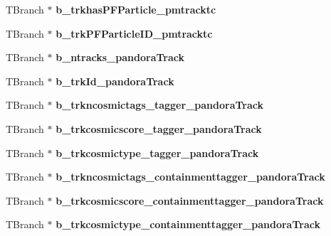 \begin{DoxyCompactItemize}
\item 
\hypertarget{classanatree_a45ab227987467c729806898d0ed23a5f}{T\-Branch $\ast$ {\bfseries b\-\_\-trkhas\-P\-F\-Particle\-\_\-pmtracktc}}\label{classanatree_a45ab227987467c729806898d0ed23a5f}

\item 
\hypertarget{classanatree_aa2272aed6f8daf4970c8b10839373021}{T\-Branch $\ast$ {\bfseries b\-\_\-trk\-P\-F\-Particle\-I\-D\-\_\-pmtracktc}}\label{classanatree_aa2272aed6f8daf4970c8b10839373021}

\item 
\hypertarget{classanatree_a3fe1408a4b38ef9ccce5cb055e4ef1a6}{T\-Branch $\ast$ {\bfseries b\-\_\-ntracks\-\_\-pandora\-Track}}\label{classanatree_a3fe1408a4b38ef9ccce5cb055e4ef1a6}

\item 
\hypertarget{classanatree_a032199668b40171279c6d42655ae8692}{T\-Branch $\ast$ {\bfseries b\-\_\-trk\-Id\-\_\-pandora\-Track}}\label{classanatree_a032199668b40171279c6d42655ae8692}

\item 
\hypertarget{classanatree_a49f812bf3a93903d7b6101d93180fa94}{T\-Branch $\ast$ {\bfseries b\-\_\-trkncosmictags\-\_\-tagger\-\_\-pandora\-Track}}\label{classanatree_a49f812bf3a93903d7b6101d93180fa94}

\item 
\hypertarget{classanatree_a1ad8e0ae9b7214697bb471609cc4af0b}{T\-Branch $\ast$ {\bfseries b\-\_\-trkcosmicscore\-\_\-tagger\-\_\-pandora\-Track}}\label{classanatree_a1ad8e0ae9b7214697bb471609cc4af0b}

\item 
\hypertarget{classanatree_a2ad042b0c5fb7ec3e96e9da8037119f4}{T\-Branch $\ast$ {\bfseries b\-\_\-trkcosmictype\-\_\-tagger\-\_\-pandora\-Track}}\label{classanatree_a2ad042b0c5fb7ec3e96e9da8037119f4}

\item 
\hypertarget{classanatree_a96205e309f975ee102c33cb8b84e324c}{T\-Branch $\ast$ {\bfseries b\-\_\-trkncosmictags\-\_\-containmenttagger\-\_\-pandora\-Track}}\label{classanatree_a96205e309f975ee102c33cb8b84e324c}

\item 
\hypertarget{classanatree_af4c33dc332c24a2b75dcdef4cd9d4e10}{T\-Branch $\ast$ {\bfseries b\-\_\-trkcosmicscore\-\_\-containmenttagger\-\_\-pandora\-Track}}\label{classanatree_af4c33dc332c24a2b75dcdef4cd9d4e10}

\item 
\hypertarget{classanatree_aaa3c883252cdaf10fb0deddf5c8a83c9}{T\-Branch $\ast$ {\bfseries b\-\_\-trkcosmictype\-\_\-containmenttagger\-\_\-pandora\-Track}}\label{classanatree_aaa3c883252cdaf10fb0deddf5c8a83c9}


\end{DoxyCompactItemize}
